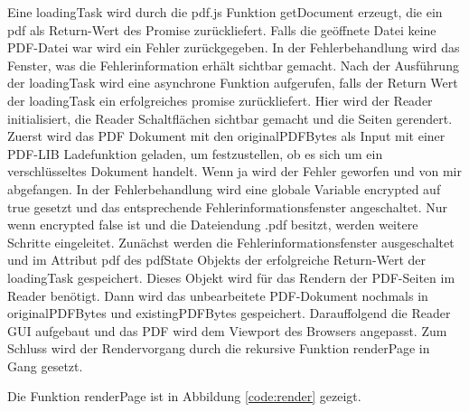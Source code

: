 Eine loadingTask wird durch die pdf.js Funktion getDocument erzeugt, die ein pdf als Return-Wert des Promise zurückliefert. Falls die geöffnete Datei keine PDF-Datei war wird ein Fehler zurückgegeben. In der Fehlerbehandlung wird das Fenster, was die Fehlerinformation erhält sichtbar gemacht. Nach der Ausführung der loadingTask wird eine asynchrone Funktion aufgerufen, falls der Return Wert der loadingTask ein erfolgreiches promise zurückliefert. Hier wird der Reader initialisiert, die Reader Schaltflächen sichtbar gemacht und die Seiten gerendert. Zuerst wird das PDF Dokument mit den originalPDFBytes als Input mit einer PDF-LIB Ladefunktion geladen, um festzustellen, ob es sich um ein verschlüsseltes Dokument handelt. Wenn ja wird der Fehler geworfen und von mir abgefangen. In der Fehlerbehandlung wird eine globale Variable encrypted auf true gesetzt und das entsprechende Fehlerinformationsfenster angeschaltet. Nur wenn encrypted false ist und die Dateiendung .pdf besitzt, werden weitere Schritte eingeleitet. Zunächst werden die Fehlerinformationsfenster ausgeschaltet und im Attribut pdf des pdfState Objekts der erfolgreiche Return-Wert der loadingTask gespeichert. Dieses Objekt wird für das Rendern der PDF-Seiten im Reader benötigt. Dann wird das unbearbeitete PDF-Dokument nochmals in originalPDFBytes und existingPDFBytes gespeichert. Darauffolgend die Reader GUI aufgebaut und das PDF wird dem Viewport des Browsers angepasst. Zum Schluss wird der Rendervorgang durch die rekursive Funktion renderPage in Gang gesetzt.
\par
Die Funktion renderPage ist in Abbildung \ref{code:render} gezeigt.

